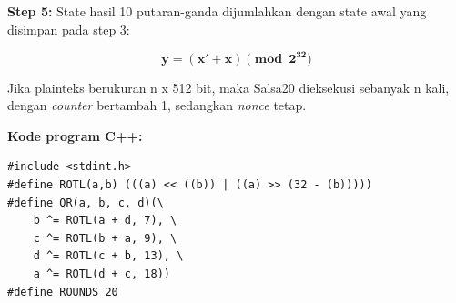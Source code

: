 \documentclass{article}
\begin{document}

\textbf{Step 5:} State hasil 10 putaran-ganda dijumlahkan dengan state awal yang disimpan pada step 3:

\[
\mathbf{y = (x' + x) \pmod{2^{32}}}
\]

Jika plainteks berukuran n x 512 bit, maka Salsa20 dieksekusi sebanyak n kali, dengan \textit{counter} bertambah 1, sedangkan \textit{nonce} tetap.

\textbf{Kode program C++:}

\begin{verbatim}
#include <stdint.h>
#define ROTL(a,b) (((a) << ((b)) | ((a) >> (32 - (b)))))
#define QR(a, b, c, d)(\ 
    b ^= ROTL(a + d, 7), \ 
    c ^= ROTL(b + a, 9), \ 
    d ^= ROTL(c + b, 13), \ 
    a ^= ROTL(d + c, 18))
#define ROUNDS 20
\end{verbatim}
\end{document}
